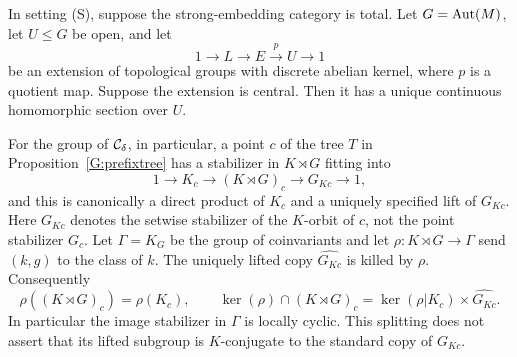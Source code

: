 \begin{proposition}
\label{G:centralextensions}
In setting \textup{(S)}, suppose the strong-embedding category is
total. Let $G=\operatorname{Aut}(M)$, let $U\leq G$ be open, and let
\[
 1\longrightarrow L\longrightarrow E\stackrel{p}{\longrightarrow}U
 \longrightarrow1
\]
be an extension of topological groups with discrete abelian kernel,
where $p$ is a quotient map. Suppose the extension is central. Then it has a unique continuous
homomorphic section over $U$.

For the group of $\mathcal C_\delta$, in particular, a point $c$ of the
tree $T$ in Proposition~\ref{G:prefixtree} has a stabilizer in
$K\rtimes G$ fitting into
\[
 1\longrightarrow K_c\longrightarrow (K\rtimes G)_c
 \longrightarrow G_{Kc}\longrightarrow1,
\]
and this is canonically a direct product of $K_c$ and a uniquely
specified lift of $G_{Kc}$. Here $G_{Kc}$ denotes the setwise
stabilizer of the $K$-orbit of $c$, not the point stabilizer $G_c$.
Let $\Gamma=K_G$ be the group of coinvariants and let
$\rho:K\rtimes G\to\Gamma$ send $(k,g)$ to the class of $k$.
The uniquely lifted copy $\widehat{G_{Kc}}$ is killed by $\rho$.
Consequently
\[
 \rho((K\rtimes G)_c)=\rho(K_c),\qquad
 \ker(\rho)\cap(K\rtimes G)_c
 =\ker(\rho|K_c)\times\widehat{G_{Kc}}.
\]
In particular the image stabilizer in $\Gamma$ is locally cyclic.
This splitting does not assert that its lifted subgroup is
$K$-conjugate to the standard copy of $G_{Kc}$.
\end{proposition}

